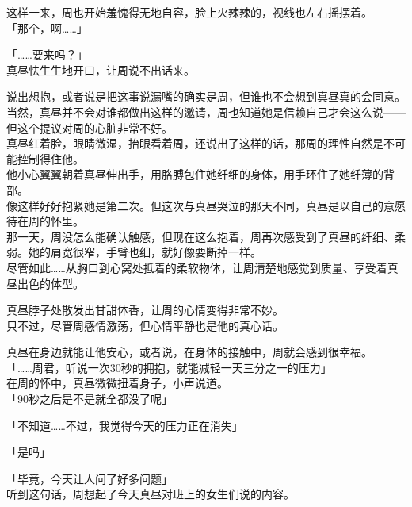 这样一来，周也开始羞愧得无地自容，脸上火辣辣的，视线也左右摇摆着。\\

「那个，啊……」

「……要来吗？」\\

真昼怯生生地开口，让周说不出话来。

说出想抱，或者说是把这事说漏嘴的确实是周，但谁也不会想到真昼真的会同意。\\

当然，真昼并不会对谁都做出这样的邀请，周也知道她是信赖自己才会这么说——但这个提议对周的心脏非常不好。\\

真昼红着脸，眼睛微湿，抬眼看着周，还说出了这样的话，那周的理性自然是不可能控制得住他。\\

他小心翼翼朝着真昼伸出手，用胳膊包住她纤细的身体，用手环住了她纤薄的背部。\\

像这样好好抱紧她是第二次。但这次与真昼哭泣的那天不同，真昼是以自己的意愿待在周的怀里。\\

那一天，周没怎么能确认触感，但现在这么抱着，周再次感受到了真昼的纤细、柔弱。她的肩宽很窄，手臂也细，就好像要断掉一样。\\

尽管如此……从胸口到心窝处抵着的柔软物体，让周清楚地感觉到质量、享受着真昼出色的体型。

真昼脖子处散发出甘甜体香，让周的心情变得非常不妙。\\

只不过，尽管周感情激荡，但心情平静也是他的真心话。

真昼在身边就能让他安心，或者说，在身体的接触中，周就会感到很幸福。\\

「……周君，听说一次30秒的拥抱，就能减轻一天三分之一的压力」\\

在周的怀中，真昼微微扭着身子，小声说道。\\

「90秒之后是不是就全都没了呢」

「不知道……不过，我觉得今天的压力正在消失」

「是吗」

「毕竟，今天让人问了好多问题」\\

听到这句话，周想起了今天真昼对班上的女生们说的内容。\\

